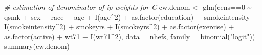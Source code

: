 \documentclass[
  10pt,
]{book}
\newenvironment{Shaded}{\begin{snugshade}}{\end{snugshade}}
\newcommand{\AttributeTok}[1]{\textcolor[rgb]{0.77,0.63,0.00}{#1}}
\newcommand{\CommentTok}[1]{\textcolor[rgb]{0.56,0.35,0.01}{\textit{#1}}}
\newcommand{\DecValTok}[1]{\textcolor[rgb]{0.00,0.00,0.81}{#1}}
\newcommand{\FunctionTok}[1]{\textcolor[rgb]{0.00,0.00,0.00}{#1}}
\newcommand{\NormalTok}[1]{#1}
\newcommand{\OtherTok}[1]{\textcolor[rgb]{0.56,0.35,0.01}{#1}}
\newcommand{\SpecialCharTok}[1]{\textcolor[rgb]{0.00,0.00,0.00}{#1}}
\newcommand{\StringTok}[1]{\textcolor[rgb]{0.31,0.60,0.02}{#1}}
\begin{document}
\begin{Shaded}
\begin{Highlighting}[]
\CommentTok{\# estimation of denominator of ip weights for C}
\NormalTok{cw.denom }\OtherTok{\textless{}{-}} \FunctionTok{glm}\NormalTok{(cens}\SpecialCharTok{==}\DecValTok{0} \SpecialCharTok{\textasciitilde{}}\NormalTok{ qsmk }\SpecialCharTok{+}\NormalTok{ sex }\SpecialCharTok{+}\NormalTok{ race }\SpecialCharTok{+}\NormalTok{ age }\SpecialCharTok{+} \FunctionTok{I}\NormalTok{(age}\SpecialCharTok{\^{}}\DecValTok{2}\NormalTok{) }
                     \SpecialCharTok{+} \FunctionTok{as.factor}\NormalTok{(education) }\SpecialCharTok{+}\NormalTok{ smokeintensity }\SpecialCharTok{+} \FunctionTok{I}\NormalTok{(smokeintensity}\SpecialCharTok{\^{}}\DecValTok{2}\NormalTok{) }
                     \SpecialCharTok{+}\NormalTok{ smokeyrs }\SpecialCharTok{+} \FunctionTok{I}\NormalTok{(smokeyrs}\SpecialCharTok{\^{}}\DecValTok{2}\NormalTok{) }\SpecialCharTok{+} \FunctionTok{as.factor}\NormalTok{(exercise) }
                     \SpecialCharTok{+} \FunctionTok{as.factor}\NormalTok{(active) }\SpecialCharTok{+}\NormalTok{ wt71 }\SpecialCharTok{+} \FunctionTok{I}\NormalTok{(wt71}\SpecialCharTok{\^{}}\DecValTok{2}\NormalTok{), }
                     \AttributeTok{data =}\NormalTok{ nhefs, }\AttributeTok{family =} \FunctionTok{binomial}\NormalTok{(}\StringTok{"logit"}\NormalTok{))}
\FunctionTok{summary}\NormalTok{(cw.denom)}
\end{Highlighting}
\end{Shaded}
\end{document}
